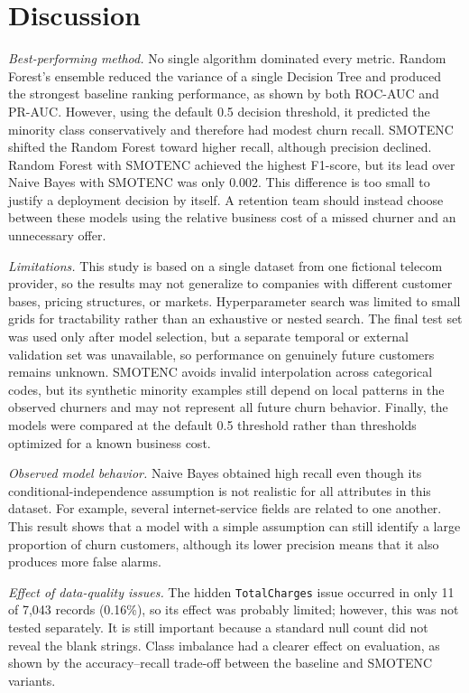 \documentclass[conference]{IEEEtran}
\begin{document}
	\section{Discussion}
	\label{sec:discussion}
	
	\textit{Best-performing method.} No single algorithm dominated every metric. Random Forest's ensemble reduced the variance of a single Decision Tree and produced the strongest baseline ranking performance, as shown by both ROC-AUC and PR-AUC. However, using the default 0.5 decision threshold, it predicted the minority class conservatively and therefore had modest churn recall. SMOTENC shifted the Random Forest toward higher recall, although precision declined. Random Forest with SMOTENC achieved the highest F1-score, but its lead over Naive Bayes with SMOTENC was only 0.002. This difference is too small to justify a deployment decision by itself. A retention team should instead choose between these models using the relative business cost of a missed churner and an unnecessary offer.
	
	\textit{Limitations.} This study is based on a single dataset from one fictional telecom provider, so the results may not generalize to companies with different customer bases, pricing structures, or markets. Hyperparameter search was limited to small grids for tractability rather than an exhaustive or nested search. The final test set was used only after model selection, but a separate temporal or external validation set was unavailable, so performance on genuinely future customers remains unknown. SMOTENC avoids invalid interpolation across categorical codes, but its synthetic minority examples still depend on local patterns in the observed churners and may not represent all future churn behavior. Finally, the models were compared at the default 0.5 threshold rather than thresholds optimized for a known business cost.
	
	\textit{Observed model behavior.} Naive Bayes obtained high recall even though its conditional-independence assumption is not realistic for all attributes in this dataset. For example, several internet-service fields are related to one another. This result shows that a model with a simple assumption can still identify a large proportion of churn customers, although its lower precision means that it also produces more false alarms.
	
	\textit{Effect of data-quality issues.} The hidden \texttt{TotalCharges} issue occurred in only 11 of 7{,}043 records (0.16\%), so its effect was probably limited; however, this was not tested separately. It is still important because a standard null count did not reveal the blank strings. Class imbalance had a clearer effect on evaluation, as shown by the accuracy--recall trade-off between the baseline and SMOTENC variants.
	
\end{document}
